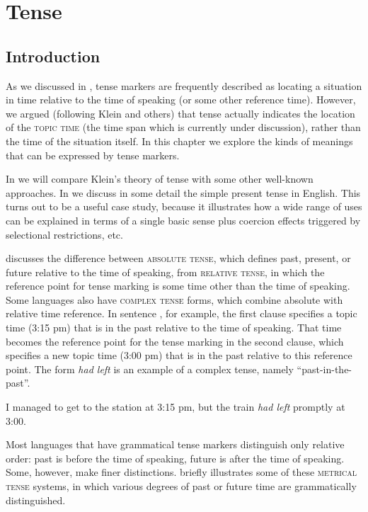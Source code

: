 \chapter{Tense}\label{sec:21}

\section{Introduction}\label{sec:21.1}

As we discussed in , tense markers are frequently described as locating a situation in time relative to the time of speaking (or some other reference time). However, we argued (following Klein and others) that tense actually indicates the location of the \textsc{topic time} (the time span which is currently under discussion), rather than the time of the situation itself. In this chapter we explore the kinds of meanings that can be expressed by tense markers.



In  we will compare Klein’s theory of tense with some other well-known approaches. In  we discuss in some detail the simple present tense in English. This turns out to be a useful case study, because it illustrates how a wide range of uses can be explained in terms of a single basic sense plus coercion effects triggered by selectional restrictions, etc.



 discusses the difference between \textsc{absolute tense}, which defines past, present, or future relative to the time of speaking, from \textsc{relative tense}, in which the reference point for tense marking is some time other than the time of speaking. Some languages also have \textsc{complex tense} forms, which combine absolute with relative time reference. In sentence , for example, the first clause specifies a topic time (3:15 pm) that is in the past relative to the time of speaking. That time becomes the reference point for the tense marking in the second clause, which specifies a new topic time (3:00 pm) that is in the past relative to this reference point. The form \textit{had left} is an example of a complex tense, namely “past-in-the-past”.


\ea \label{ex:21.1}
I managed to get to the station at 3:15 pm, but the train \textit{had left} promptly at 3:00.
\z


Most languages that have grammatical tense markers distinguish only relative order: past is before the time of speaking, future is after the time of speaking. Some, however, make finer distinctions.  briefly illustrates some of these \textsc{metrical tense} systems, in which various degrees of past or future time are grammatically distinguished. 


